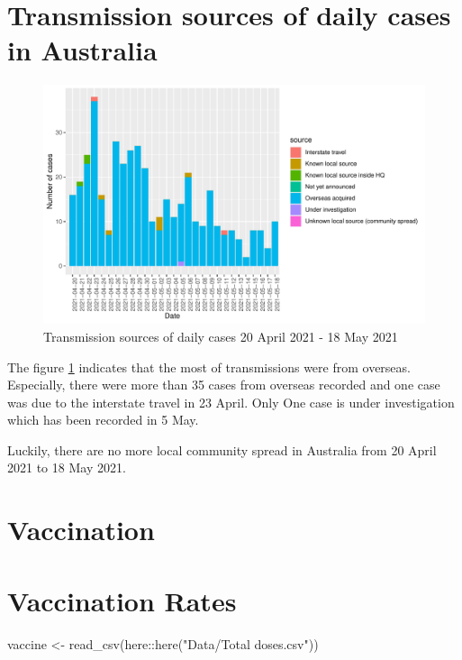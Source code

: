 \documentclass[11pt,a4paper,]{article}
\newenvironment{Shaded}{\begin{snugshade}}{\end{snugshade}}
\newcommand{\FunctionTok}[1]{\textcolor[rgb]{0.00,0.00,0.00}{#1}}
\newcommand{\NormalTok}[1]{#1}
\newcommand{\OtherTok}[1]{\textcolor[rgb]{0.56,0.35,0.01}{#1}}
\newcommand{\SpecialCharTok}[1]{\textcolor[rgb]{0.00,0.00,0.00}{#1}}
\newcommand{\StringTok}[1]{\textcolor[rgb]{0.31,0.60,0.02}{#1}}
\begin{document}
\section*{Transmission sources of daily cases in Australia}

\begin{figure}

{\centering \includegraphics{report_files/figure-latex/tra-1} 

}

\caption{Transmission sources of daily cases 20 April 2021 - 18 May 2021}\label{fig:tra}
\end{figure}

The figure \ref{fig:tra} indicates that the most of transmissions were from overseas. Especially, there were more than 35 cases from overseas recorded and one case was due to the interstate travel in 23 April. Only One case is under investigation which has been recorded in 5 May.

Luckily, there are no more local community spread in Australia from 20 April 2021 to 18 May 2021.

\section*{Vaccination}

\hypertarget{vaccination-rates}{%
\section{Vaccination Rates}\label{vaccination-rates}}

\begin{Shaded}
\begin{Highlighting}[]
\NormalTok{vaccine }\OtherTok{\textless{}{-}} \FunctionTok{read\_csv}\NormalTok{(here}\SpecialCharTok{::}\FunctionTok{here}\NormalTok{(}\StringTok{"Data/Total doses.csv"}\NormalTok{))}
\end{Highlighting}
\end{Shaded}
\end{document}
